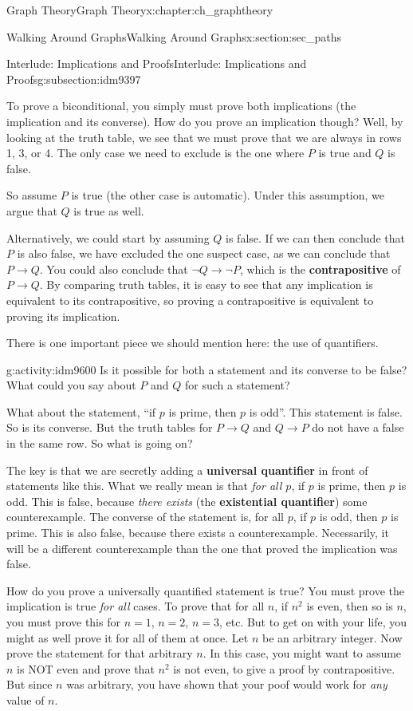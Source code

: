 \documentclass[oneside,10pt,]{book}
\newcommand{\terminology}[1]{\textbf{#1}}
\numberwithin{equation}{chapter}
\def\imp{\rightarrow}
\begin{document}
\begin{chapterptx}{Graph Theory}{}{Graph Theory}{}{}{x:chapter:ch_graphtheory}
\begin{sectionptx}{Walking Around Graphs}{}{Walking Around Graphs}{}{}{x:section:sec_paths}
\begin{subsectionptx}{Interlude: Implications and Proofs}{}{Interlude: Implications and Proofs}{}{}{g:subsection:idm9397}
\par
To prove a biconditional, you simply must prove both implications (the implication and its converse).  How do you prove an implication though?  Well, by looking at the truth table, we see that we must prove that we are always in rows 1, 3, or 4.  The only case we need to exclude is the one where \(P\) is true and \(Q\) is false.%
\par
So assume \(P\) is true (the other case is automatic).  Under this assumption, we argue that \(Q\) is true as well.%
\par
Alternatively, we could start by assuming \(Q\) is false.  If we can then conclude that \(P\) is also false, we have excluded the one suspect case, as we can conclude that \(P \imp Q\).  You could also conclude that \(\neg Q \imp \neg P\), which is the \terminology{contrapositive} of \(P \imp Q\).  By comparing truth tables, it is easy to see that any implication is equivalent to its contrapositive, so proving a contrapositive is equivalent to proving its implication.%
\par
There is one important piece we should mention here: the use of quantifiers.%
\begin{activity}{}{g:activity:idm9600}%
Is it possible for both a statement and its converse to be false?  What could you say about \(P\) and \(Q\) for such a statement?%
\end{activity}
What about the statement, ``if \(p\) is prime, then \(p\) is odd''.  This statement is false.  So is its converse.  But the truth tables for \(P \imp Q\) and \(Q \imp P\) do not have a false in the same row.  So what is going on?%
\par
The key is that we are secretly adding a \terminology{universal quantifier} in front of statements like this.  What we really mean is that \emph{for all \(p\)}, if \(p\) is prime, then \(p\) is odd.  This is false, because \emph{there exists} (the \terminology{existential quantifier}) some counterexample.  The converse of the statement is, for all \(p\), if \(p\) is odd, then \(p\) is prime.  This is also false, because there exists a counterexample.  Necessarily, it will be a different counterexample than the one that proved the implication was false.%
\par
How do you prove a universally quantified statement is true?  You must prove the implication is true \emph{for all} cases.  To prove that for all \(n\), if \(n^2\) is even, then so is \(n\), you must prove this for \(n = 1\), \(n = 2\), \(n =3\), etc.  But to get on with your life, you might as well prove it for all of them at once.  Let \(n\) be an arbitrary integer.  Now prove the statement for that arbitrary \(n\).  In this case, you might want to assume \(n\) is NOT even and prove that \(n^2\) is not even, to give a proof by contrapositive.  But since \(n\) was arbitrary, you have shown that your poof would work for \emph{any} value of \(n\).%

\end{subsectionptx}
\end{sectionptx}
\end{chapterptx}
\end{document}

